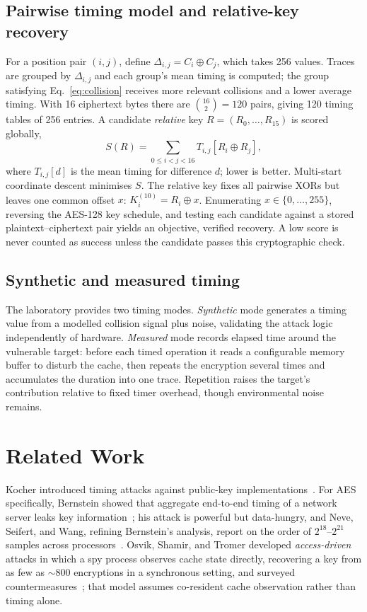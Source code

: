 \documentclass[11pt]{article}
\begin{document}
\subsection{Pairwise timing model and relative-key recovery}
For a position pair $(i,j)$, define $\Delta_{i,j}=C_i\oplus C_j$, which takes 256
values. Traces are grouped by $\Delta_{i,j}$ and each group's mean timing is
computed; the group satisfying Eq.~\eqref{eq:collision} receives more relevant
collisions and a lower average timing. With 16 ciphertext bytes there are
$\binom{16}{2}=120$ pairs, giving 120 timing tables of 256 entries. A candidate
\emph{relative} key $R=(R_0,\dots,R_{15})$ is scored globally,
\begin{equation}
S(R)=\sum_{0\le i<j<16} T_{i,j}[R_i\oplus R_j],
\label{eq:score}
\end{equation}
where $T_{i,j}[d]$ is the mean timing for difference $d$; lower is better.
Multi-start coordinate descent minimises $S$. The relative key fixes all pairwise
XORs but leaves one common offset $x$: $K^{(10)}_i = R_i \oplus x$. Enumerating
$x\in\{0,\dots,255\}$, reversing the AES-128 key schedule, and testing each
candidate against a stored plaintext--ciphertext pair yields an objective,
verified recovery. A low score is never counted as success unless the candidate
passes this cryptographic check.

\subsection{Synthetic and measured timing}
The laboratory provides two timing modes. \emph{Synthetic} mode generates a
timing value from a modelled collision signal plus noise, validating the attack
logic independently of hardware. \emph{Measured} mode records elapsed time around
the vulnerable target: before each timed operation it reads a configurable memory
buffer to disturb the cache, then repeats the encryption several times and
accumulates the duration into one trace. Repetition raises the target's
contribution relative to fixed timer overhead, though environmental noise
remains.

\section{Related Work}
\label{sec:related}

Kocher introduced timing attacks against public-key
implementations~\cite{kocher96}. For AES specifically, Bernstein showed that
aggregate end-to-end timing of a network server leaks key
information~\cite{bernstein05}; his attack is powerful but data-hungry, and
Neve, Seifert, and Wang, refining Bernstein's analysis, report on the order of
$2^{18}$--$2^{21}$ samples across processors~\cite{neve06}. Osvik, Shamir, and
Tromer developed \emph{access-driven} attacks in which a spy process observes
cache state directly, recovering a key from as few as $\sim$800 encryptions in a
synchronous setting, and surveyed countermeasures~\cite{osvik06}; that model
assumes co-resident cache observation rather than timing alone.
\end{document}
